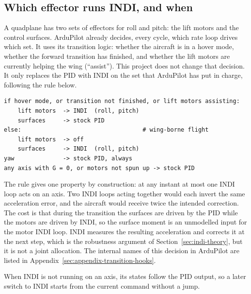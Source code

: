 \documentclass{article}
\begin{document}
\subsection{Which effector runs INDI, and when}
\label{sec:indi-fw-implementation}
A quadplane has two sets of effectors for roll and pitch: the lift motors and the control surfaces. ArduPilot already decides, every cycle, which rate loop drives which set. It uses its transition logic: whether the aircraft is in a hover mode, whether the forward transition has finished, and whether the lift motors are currently helping the wing (``assist''). This project does not change that decision. It only replaces the PID with INDI on the set that ArduPilot has put in charge, following the rule below.

\begin{lstlisting}[style=pseudostyle, caption={Effector ownership, evaluated every control cycle.}, label={lst:ownership}]
if hover mode, or transition not finished, or lift motors assisting:
    lift motors  -> INDI  (roll, pitch)
    surfaces     -> stock PID
else:                                   # wing-borne flight
    lift motors  -> off
    surfaces     -> INDI  (roll, pitch)
yaw              -> stock PID, always
any axis with G = 0, or motors not spun up -> stock PID
\end{lstlisting}

The rule gives one property by construction: at any instant at most one INDI loop acts on an axis. Two INDI loops acting together would each invert the same acceleration error, and the aircraft would receive twice the intended correction. The cost is that during the transition the surfaces are driven by the PID while the motors are driven by INDI, so the surface moment is an unmodelled input for the motor INDI loop. INDI measures the resulting acceleration and corrects it at the next step, which is the robustness argument of Section~\ref{sec:indi-theory}, but it is not a joint allocation. The internal names of this decision in ArduPilot are listed in Appendix~\ref{sec:appendix-transition-hooks}.

When INDI is not running on an axis, its states follow the PID output, so a later switch to INDI starts from the current command without a jump.

\end{document}
